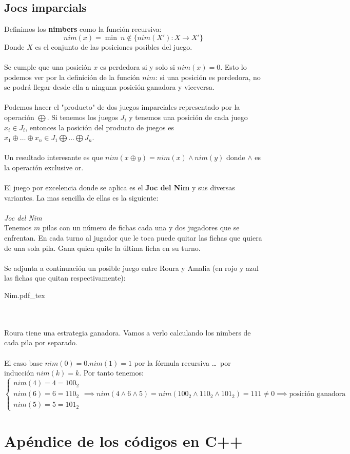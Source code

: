 \documentclass[leqno]{article}
\newcommand{\incfig}[1]{%
  \begin{center}
  \def\svgwidth{0.9\columnwidth}
  {#1.pdf_tex}
  \end{center}
}
\begin{document}
\subsection{Jocs imparcials}
Definimos los \textbf{nimbers} como la función recursiva:
\[
nim(x) = \min \ n\not\in \{nim(X') : X\to X'\}
\]
Donde $X$ es el conjunto de las posiciones posibles del juego.\\
\\
Se cumple que una posición $x$ es perdedora si y solo si $nim(x)=0$. Esto lo podemos ver por la definición de la función $nim$: si una posición es perdedora, no se podrá llegar desde ella a ninguna posición ganadora y viceversa.\\
\\
Podemos hacer el "producto" de dos juegos imparciales representado por la operación $\bigoplus$. Si tenemos los juegos $J_i$ y tenemos una posición de cada juego $x_i\in J_i$, entonces la posición del producto de juegos es $x_1\oplus\ldots\oplus x_n\in J_1\bigoplus\ldots\bigoplus J_n$.\\
\\
Un resultado interesante es que $nim(x\oplus y) = nim(x) \wedge nim(y)$ donde $\wedge$ es la operación exclusive or.\\
\\
El juego por excelencia donde se aplica es el \textbf{Joc del Nim} y sus diversas variantes. La mas sencilla de ellas es la siguiente: \\
\\
\textit{Joc del Nim}\\
Tenemos $m$ pilas con un número de fichas cada una y dos jugadores que se enfrentan. En cada turno al jugador que le toca puede quitar las fichas que quiera de una sola pila. Gana quien quite la última ficha en su turno.\\
\\
Se adjunta a continuación un posible juego entre Roura y Amalia (en rojo y azul las fichas que quitan respectivamente):\\
\incfig{Nim}
\\
\\
Roura tiene una estrategia ganadora. Vamos a verlo calculando los nimbers de cada pila por separado. \\
\\
El caso base $nim(0)=0$.$nim(1)=1$ por la fórmula recursiva  \ldots \ por inducción $nim(k)=k$. Por tanto tenemos:
 \[
\begin{cases}
  nim(4)=4=100_2 \\
  nim(6)=6 = 110_2\\
  nim(5)=5 = 101_2
\end{cases}
\implies nim(4\wedge 6 \wedge 5) =  nim(100_2\wedge 110_2 \wedge 101_2) = 111 \neq 0 \implies \boxed{\text{posición ganadora}}
\] 

\section{Apéndice de los códigos en C++}


\end{document}
